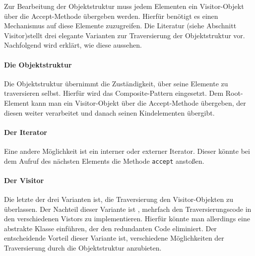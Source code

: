 Zur Bearbeitung der Objektstruktur muss jedem Elementen ein Visitor-Objekt über die Accept-Methode übergeben werden. Hierfür benötigt es einen Mechanismus auf diese Elemente zuzugreifen.
Die Literatur (siehe \cite{GOF95} Abschnitt Visitor)stellt drei elegante Varianten zur Traversierung der Objektstruktur vor. Nachfolgend wird erklärt, wie diese aussehen.
\paragraph{Die Objektstruktur} Die Objektstruktur übernimmt die Zuständigkeit, über seine Elemente zu traversieren selbst. Hierfür wird das Composite-Pattern eingesetzt. Dem Root-Element kann man ein Visitor-Objekt über die Accept-Methode übergeben, der diesen weiter verarbeitet und danach seinen Kindelementen übergibt. 
\paragraph{Der Iterator} Eine andere Möglichkeit ist ein interner oder externer Iterator. Dieser könnte bei dem Aufruf des nächsten Elements die Methode \texttt{accept} anstoßen.
\paragraph{Der Visitor} Die letzte der drei Varianten ist, die Traversierung den Visitor-Objekten zu überlassen. Der Nachteil dieser Variante ist , mehrfach den Traversierungscode in den verschiedenen Vistors zu implementieren. Hierfür könnte man allerdings eine abstrakte Klasse einführen, der den redundanten Code eliminiert. Der entscheidende Vorteil dieser Variante ist, verschiedene Möglichkeiten der Traversierung durch die Objektstruktur anzubieten.



